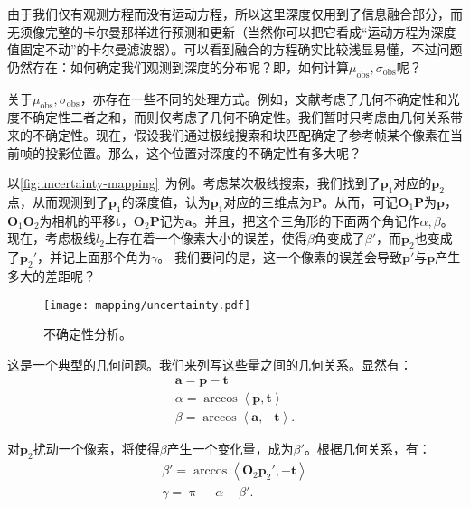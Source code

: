 由于我们仅有观测方程而没有运动方程，所以这里深度仅用到了信息融合部分，而无须像完整的卡尔曼那样进行预测和更新（当然你可以把它看成“运动方程为深度值固定不动”的卡尔曼滤波器）。可以看到融合的方程确实比较浅显易懂，不过问题仍然存在：如何确定我们观测到深度的分布呢？即，如何计算$\mu_{\mathrm{obs}}, \sigma_{\mathrm{obs}}$呢？

关于$\mu_{\mathrm{obs}}, \sigma_{\mathrm{obs}}$，亦存在一些不同的处理方式。例如，文献\cite{Engel2013}考虑了几何不确定性和光度不确定性二者之和，而\cite{Vogiatzis2011}则仅考虑了几何不确定性。我们暂时只考虑由几何关系带来的不确定性。现在，假设我们通过极线搜索和块匹配确定了参考帧某个像素在当前帧的投影位置。那么，这个位置对深度的不确定性有多大呢？

以\autoref{fig:uncertainty-mapping}~为例。考虑某次极线搜索，我们找到了$\bm{p}_1$对应的$\bm{p}_2$点，从而观测到了$\bm{p}_1$的深度值，认为$\bm{p}_1$对应的三维点为$\bm{P}$。从而，可记$\bm{O}_1 \bm{P}$为$\bm{p}$，$\bm{O}_1 \bm{O}_2$为相机的平移$\bm{t}$，$\bm{O}_2 \bm{P}$记为$\bm{a}$。并且，把这个三角形的下面两个角记作$\alpha, \beta$。现在，考虑极线$l_2$上存在着一个像素大小的误差，使得$\beta$角变成了$\beta'$，而$\bm{p}_2$也变成了$\bm{p}_2'$，并记上面那个角为$\gamma$。 我们要问的是，这一个像素的误差会导致$\bm{p}'$与$\bm{p}$产生多大的差距呢？

\begin{figure}[!ht]
	\centering
	\texttt{[image: mapping/uncertainty.pdf]}
	\caption{不确定性分析。}
	\label{fig:uncertainty-mapping}
\end{figure}

这是一个典型的几何问题。我们来列写这些量之间的几何关系。显然有：
\begin{equation}
\begin{array}{l}
\bm{a} = \bm{p} - \bm{t} \\
\alpha  = \arccos \left\langle {\bm{p}, \bm{t}} \right\rangle \\
\beta  = \arccos \left\langle {\bm{a}, - \bm{t}} \right\rangle .
\end{array}
\end{equation}

对$\bm{p}_2$扰动一个像素，将使得$\beta$产生一个变化量，成为$\beta '$。根据几何关系，有：
\begin{equation}
\begin{array}{l}
\beta ' = \arccos \left\langle {\bm{O}_2 \bm{p}_2', -\bm{t}} \right\rangle \\
\gamma  = \uppi  - \alpha  - \beta '.
\end{array}
\end{equation}

